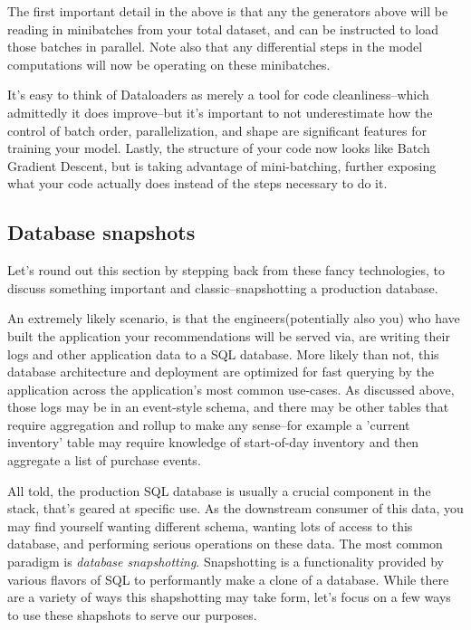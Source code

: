 The first important detail in the above is that any the generators above will be reading in minibatches from your total dataset, and can be instructed to load those batches in parallel. Note also that any differential steps in the model computations will now be operating on these minibatches. 

It's easy to think of Dataloaders as merely a tool for code cleanliness–which admittedly it does improve–but it's important to not underestimate how the control of batch order, parallelization, and shape are significant features for training your model. Lastly, the structure of your code now looks like Batch Gradient Descent, but is taking advantage of mini-batching, further exposing what your code actually does instead of the steps necessary to do it.

\subsection{Database snapshots}

Let's round out this section by stepping back from these fancy technologies, to discuss something important and classic–snapshotting a production database.

An extremely likely scenario, is that the engineers(potentially also you) who have built the application your recommendations will be served via, are writing their logs and other application data to a SQL database. More likely than not, this database architecture and deployment are optimized for fast querying by the application across the application's most common use-cases. As discussed above, those logs may be in an event-style schema, and there may be other tables that require aggregation and rollup to make any sense–for example a 'current inventory' table may require knowledge of start-of-day inventory and then aggregate a list of purchase events.

All told, the production SQL database is usually a crucial component in the stack, that's geared at specific use. As the downstream consumer of this data, you may find yourself wanting different schema, wanting lots of access to this database, and performing serious operations on these data. The most common paradigm is \emph{database snapshotting}. Snapshotting is a functionality provided by various flavors of SQL to performantly make a clone of a database. While there are a variety of ways this shapshotting may take form, let's focus on a few ways to use these shapshots to serve our purposes.

